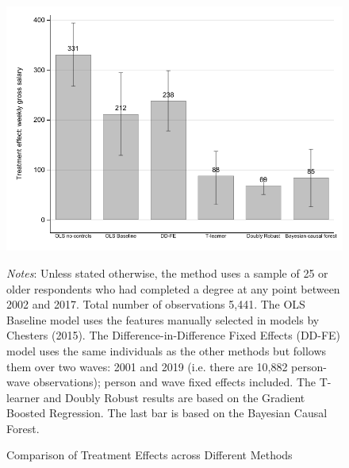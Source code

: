 \documentclass[12pt, a4paper]{article}
\begin{document}



\clearpage

\begin{figure}[htbp]
\centering
\caption{Comparison of Treatment Effects across Different Methods}
\vspace{0.5cm}
  \label{fig:method}
    \includegraphics{_figures/method_v2.pdf}
\parbox{1\textwidth}{\footnotesize{\textit{Notes}: Unless stated otherwise, the method uses a sample of 25 or older respondents who had completed a degree at any point between 2002 and 2017. Total number of observations 5,441. The OLS Baseline model uses the features manually selected in models by Chesters (2015). The Difference-in-Difference Fixed Effects (DD-FE) model uses the same individuals as the other methods but follows them over two waves: 2001 and 2019 (i.e. there are 10,882 person-wave observations); person and wave fixed effects included. The T-learner and Doubly Robust results are based on the Gradient Boosted Regression. The last bar is based on the Bayesian Causal Forest.}}
\end{figure}
\end{document}
